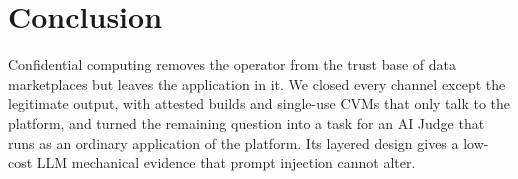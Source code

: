 \section{Conclusion}\label{sec:conclusion}

Confidential computing removes the operator from the trust base of data marketplaces but leaves
the application in it. We closed every channel except the legitimate output, with attested builds
and single-use CVMs that only talk to the platform, and turned the remaining question into a task
for an AI Judge that runs as an ordinary application of the platform. Its layered design gives a
low-cost LLM mechanical evidence that prompt injection cannot alter.
